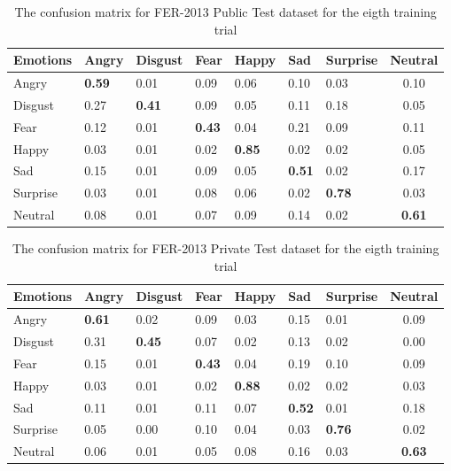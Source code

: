 \documentclass[runningheads,a4paper,11pt]{report}
\begin{document}
\begin{table}[htbp]
	\caption{The confusion matrix for FER-2013 Public Test dataset for the eigth training trial}
	\label{fer_training_28k_01_mean_square_augmented_x6_public_test_confusion_matrix}
		\begin{center}
			\begin{tabular}{p{40pt}p{40pt}p{40pt}p{40pt}p{40pt}p{40pt}p{40pt}c}
				\textbf{Emotions}& \textbf{Angry}& \textbf{Disgust}& \textbf{Fear}& \textbf{Happy}& \textbf{Sad}& \textbf{Surprise}& \textbf{Neutral} \\
				\hline\hline
				Angry& \textbf{0.59}& 0.01& 0.09& 0.06& 0.10& 0.03& 0.10 \\
				Disgust& 0.27& \textbf{0.41}& 0.09& 0.05& 0.11& 0.18& 0.05 \\
				Fear& 0.12& 0.01& \textbf{0.43}& 0.04& 0.21& 0.09& 0.11 \\
				Happy& 0.03& 0.01& 0.02& \textbf{0.85}& 0.02& 0.02& 0.05 \\
				Sad& 0.15& 0.01& 0.09& 0.05& \textbf{0.51}& 0.02& 0.17 \\
				Surprise& 0.03& 0.01& 0.08& 0.06& 0.02& \textbf{0.78}& 0.03 \\
				Neutral& 0.08& 0.01& 0.07& 0.09& 0.14& 0.02& \textbf{0.61} \\
				\hline
			\end{tabular}
		\end{center}
\end{table}
\begin{table}[htbp]
	\caption{The confusion matrix for FER-2013 Private Test dataset for the eigth training trial}
	\label{fer_training_28k_01_mean_square_augmented_x6_private_test_confusion_matrix}
		\begin{center}
			\begin{tabular}{p{40pt}p{40pt}p{40pt}p{40pt}p{40pt}p{40pt}p{40pt}c}
				\textbf{Emotions}& \textbf{Angry}& \textbf{Disgust}& \textbf{Fear}& \textbf{Happy}& \textbf{Sad}& \textbf{Surprise}& \textbf{Neutral} \\
				\hline\hline
				Angry& \textbf{0.61}& 0.02& 0.09& 0.03& 0.15& 0.01& 0.09 \\
				Disgust& 0.31& \textbf{0.45}& 0.07& 0.02& 0.13& 0.02& 0.00 \\
				Fear& 0.15& 0.01& \textbf{0.43}& 0.04& 0.19& 0.10& 0.09 \\
				Happy& 0.03& 0.01& 0.02& \textbf{0.88}& 0.02& 0.02& 0.03 \\
				Sad& 0.11& 0.01& 0.11& 0.07& \textbf{0.52}& 0.01& 0.18 \\
				Surprise& 0.05& 0.00& 0.10& 0.04& 0.03& \textbf{0.76}& 0.02 \\
				Neutral& 0.06& 0.01& 0.05& 0.08& 0.16& 0.03& \textbf{0.63} \\
				\hline
			\end{tabular}
		\end{center}
\end{table}
\end{document}
